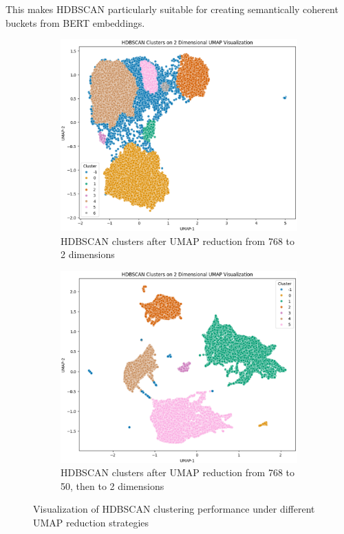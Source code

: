 \documentclass[twocolumn]{article}
\begin{document}
This makes HDBSCAN particularly suitable for creating semantically coherent buckets from BERT embeddings.
\begin{figure}[H]
    \centering
    \begin{subfigure}[b]{\linewidth}
        \includegraphics[width=\linewidth]{hdbscan-768-2.eps}
        \caption{HDBSCAN clusters after UMAP reduction from 768 to 2 dimensions}
        \label{fig:hdbscan-visualization-figure1}
    \end{subfigure}
    \begin{subfigure}[b]{\linewidth}
        \includegraphics[width=\linewidth]{hdbscan-768-50-2.eps}
        \caption{HDBSCAN clusters after UMAP reduction from 768 to 50, then to 2 dimensions}
        \label{fig:hdbscan-visualization-figure2}
    \end{subfigure}
    \caption{Visualization of HDBSCAN clustering performance under different UMAP reduction strategies}
    \label{fig:hdbscan-visualization}
\end{figure}
\end{document}
